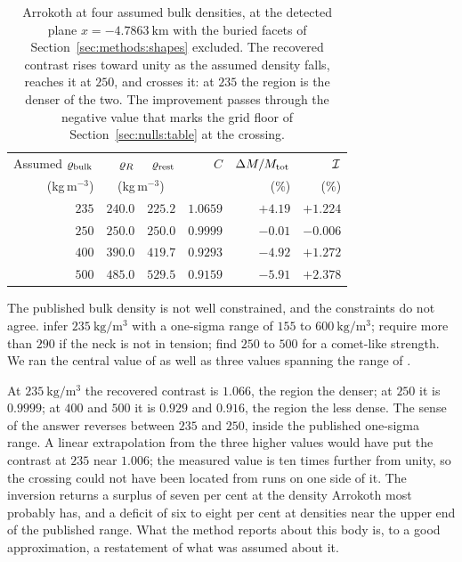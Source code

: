 \begin{table}[htbp]
\centering
\small
\caption{Arrokoth at four assumed bulk densities, at the detected plane
$x = \SI{-4.7863}{\kilo\metre}$ with the buried facets of
Section~\ref{sec:methods:shapes} excluded. The recovered contrast rises
toward unity as the assumed density falls, reaches it at $250$, and crosses
it: at $235$ the region is the denser of the two. The improvement passes
through the negative value that marks the grid floor of
Section~\ref{sec:nulls:table} at the crossing.}
\label{tab:arrokothdensity}
\setlength{\tabcolsep}{10pt}
\begin{tabular}{rrrrrr}
\toprule
Assumed $\varrho_{\mathrm{bulk}}$ & $\varrho_{R}$ & $\varrho_{\mathrm{rest}}$ & $C$ & $\Delta M/M_{\mathrm{tot}}$ & $\mathcal{I}$ \\
(kg\,m$^{-3}$) & \multicolumn{2}{c}{(kg\,m$^{-3}$)} & & (\%) & (\%) \\
\midrule
$235$ & $240.0$ & $225.2$ & $1.0659$ & $+4.19$ & $+1.224$ \\
$250$ & $250.0$ & $250.0$ & $0.9999$ & $-0.01$ & $-0.006$ \\
$400$ & $390.0$ & $419.7$ & $0.9293$ & $-4.92$ & $+1.272$ \\
$500$ & $485.0$ & $529.5$ & $0.9159$ & $-5.91$ & $+2.378$ \\
\bottomrule
\end{tabular}
\end{table}

The published bulk density is not well constrained, and the constraints do
not agree. \citet{keane2022} infer $\SI{235}{\kilo\gram\per\cubic\metre}$
with a one-sigma range of $155$ to $\SI{600}{\kilo\gram\per\cubic\metre}$;
\citet{spencer2020} require more than $290$ if the neck is not in tension;
\citet{mckinnon2020} find $250$ to $500$ for a comet-like strength. We ran the
central value of \citet{keane2022} as well as three values spanning the
range of \citet{mckinnon2020}.

At $\SI{235}{\kilo\gram\per\cubic\metre}$ the recovered contrast is
$1.066$, the region the denser; at $250$ it is $0.9999$; at $400$ and $500$ it
is $0.929$ and $0.916$, the region the less dense. The sense of the answer
reverses between $235$ and $250$, inside the published one-sigma range. A
linear extrapolation from the three higher values would have put the
contrast at $235$ near $1.006$; the measured value is ten times further from
unity, so the crossing could not have been located from runs on one side of
it. The inversion returns a surplus of seven per cent at the density
Arrokoth most probably has, and a deficit of six to eight per cent at
densities near the upper end of the published range. What the method
reports about this body is, to a good approximation, a restatement of what
was assumed about it.

